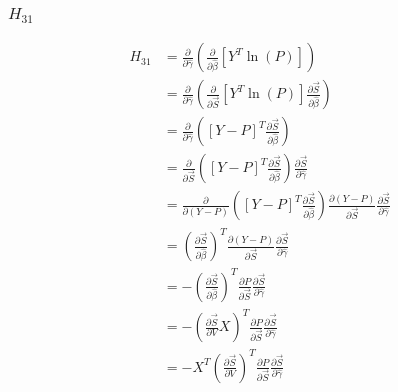 \documentclass{article}
\begin{document}
\subsubsection{$H_{31}$}
\begin{equation}
\begin{aligned}
H_{31} &= \frac{\partial}{\partial \hat{\gamma}}  \left( \frac{\partial}{\partial \hat{\beta}}  \left[ Y^T \ln \left( P \right) \right] \right)
\\
&= \frac{\partial}{\partial \hat{\gamma}}  \left( \frac{\partial}{\partial \vec{S}}  \left[ Y^T \ln \left( P \right) \right] \frac{\partial \vec{S}}{\partial \hat{\beta}} \right) 
\\
&= \frac{\partial}{\partial \hat{\gamma}}  \left( \left[ Y - P \right]^T \frac{\partial \vec{S}}{\partial \hat{\beta}} \right) 
\\
&= \frac{\partial}{\partial \vec{S}}  \left( \left[ Y - P \right]^T \frac{\partial \vec{S}}{\partial \hat{\beta}} \right) \frac{\partial \vec{S}}{\partial \hat{\gamma}} 
\\
&= \frac{\partial}{\partial \left( Y - P \right)}  \left( \left[ Y - P \right]^T \frac{\partial \vec{S}}{\partial \hat{\beta}} \right) \frac{\partial \left( Y - P \right)}{\partial \vec{S}} \frac{\partial \vec{S}}{\partial \hat{\gamma}} 
\\
&= \left( \frac{\partial \vec{S}}{\partial \hat{\beta}} \right)^T \frac{\partial \left( Y - P \right)}{\partial \vec{S}} \frac{\partial \vec{S}}{\partial \hat{\gamma}} 
\\
&= - \left( \frac{\partial \vec{S}}{\partial \hat{\beta}} \right)^T \frac{\partial P}{\partial \vec{S}}  \frac{\partial \vec{S}}{\partial \hat{\gamma}}
\\
&= - \left( \frac{\partial \vec{S}}{\partial V} X \right)^T \frac{\partial P}{\partial \vec{S}}  \frac{\partial \vec{S}}{\partial \hat{\gamma}} 
 \\
&= - X^T  \left( \frac{\partial \vec{S}}{\partial V} \right)^T \frac{\partial P}{\partial \vec{S}}  \frac{\partial \vec{S}}{\partial \hat{\gamma}}
\end{aligned}
\end{equation}
\end{document}
